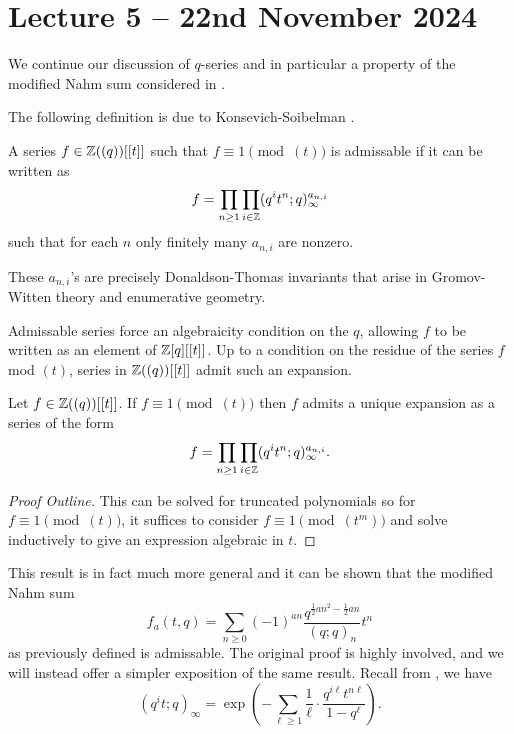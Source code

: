 \section{Lecture 5 -- 22nd November 2024}\label{sec: lecture 5}
We continue our discussion of $q$-series and in particular a property of the modified Nahm sum considered in .

The following definition is due to Konsevich-Soibelman \cite{DTInvariants}.
\begin{definition}\label{def: admissable series}
    A series $f\in\mathbb{Z}((q))[[t]]$ such that $f\equiv 1\pmod{(t)}$ is admissable if it can be written as 
    $$f=\prod_{n\geq1}\prod_{i\in\mathbb{Z}}(q^{i}t^{n};q)_{\infty}^{a_{n,i}}$$
    such that for each $n$ only finitely many $a_{n,i}$ are nonzero. 
\end{definition}
\begin{remark}
    These $a_{n,i}$'s are precisely Donaldson-Thomas invariants that arise in Gromov-Witten theory and enumerative geometry. 
\end{remark}
Admissable series force an algebraicity condition on the $q$, allowing $f$ to be written as an element of $\mathbb{Z}[q][[t]]$. Up to a condition on the residue of the series $f$ mod $(t)$, series in $\mathbb{Z}((q))[[t]]$ admit such an expansion. 
\begin{proposition}
    Let $f\in\mathbb{Z}((q))[[t]]$. If $f\equiv1\pmod{(t)}$ then $f$ admits a unique expansion as a series of the form 
    $$f=\prod_{n\geq1}\prod_{i\in\mathbb{Z}}(q^{i}t^{n};q)_{\infty}^{a_{n,i}}.$$
\end{proposition}
\begin{proof}[Proof Outline]
    This can be solved for truncated polynomials so for $f\equiv 1\pmod{(t)}$, it suffices to consider $f\equiv 1\pmod{(t^{m})}$ and solve inductively to give an expression algebraic in $t$.
\end{proof}
This result is in fact much more general and it can be shown that the modified Nahm sum 
$$f_{a}(t,q)=\sum_{n\geq0}(-1)^{an}\frac{q^{\frac{1}{2}an^{2}-\frac{1}{2}an}}{(q;q)_{n}}t^{n}$$
as previously defined is admissable. The original proof is highly involved, and we will instead offer a simpler exposition of the same result. Recall from , we have 
\begin{equation}\label{eqn: modified Nahm sum as exponent of sum}
    (q^{i}t;q)_{\infty}=\exp\left(-\sum_{\ell\geq 1}\frac{1}{\ell}\cdot\frac{q^{i\ell}t^{n\ell}}{1-q^{\ell}}\right). 
\end{equation}

